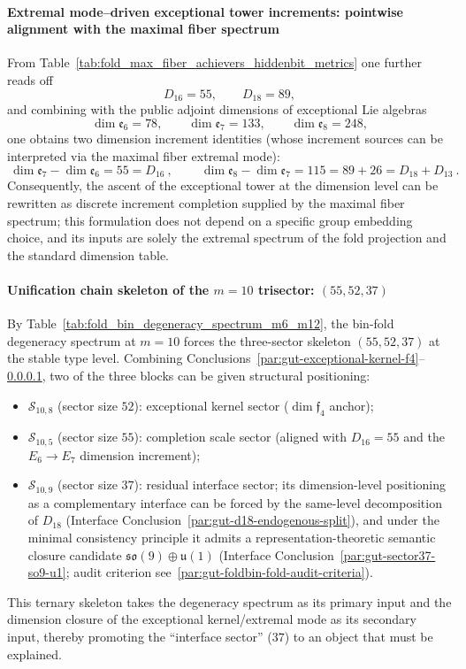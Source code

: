 \paragraph{Extremal mode--driven exceptional tower increments: pointwise alignment with the maximal fiber spectrum}\label{par:gut-maxfiber-exceptional-tower}
From Table~\ref{tab:fold_max_fiber_achievers_hiddenbit_metrics} one further reads off
\[
D_{16}=55,\qquad D_{18}=89,
\]
and combining with the public adjoint dimensions of exceptional Lie algebras
\[
\dim\mathfrak{e}_6=78,\qquad \dim\mathfrak{e}_7=133,\qquad \dim\mathfrak{e}_8=248,
\]
one obtains two dimension increment identities (whose increment sources can be interpreted via the maximal fiber extremal mode):
\[
\boxed{\ \dim\mathfrak{e}_7-\dim\mathfrak{e}_6=55=D_{16}\ },
\qquad
\boxed{\ \dim\mathfrak{e}_8-\dim\mathfrak{e}_7=115=89+26=D_{18}+D_{13}\ }.
\]
Consequently, the ascent of the exceptional tower at the dimension level can be rewritten as discrete increment completion supplied by the maximal fiber spectrum; this formulation does not depend on a specific group embedding choice, and its inputs are solely the extremal spectrum of the fold projection and the standard dimension table.

\paragraph{Unification chain skeleton of the \(m=10\) trisector: \texorpdfstring{$(55,52,37)$}{(55,52,37)}}\label{par:gut-trisector-55-52-37}
By Table~\ref{tab:fold_bin_degeneracy_spectrum_m6_m12}, the bin-fold degeneracy spectrum at \(m=10\) forces the three-sector skeleton \((55,52,37)\) at the stable type level.
Combining Conclusions~\ref{par:gut-exceptional-kernel-f4}--\ref{par:gut-maxfiber-exceptional-tower}, two of the three blocks can be given structural positioning:
\begin{itemize}
  \item \(\mathcal{S}_{10,8}\) (sector size \(52\)): exceptional kernel sector (\(\dim\mathfrak{f}_4\) anchor);
  \item \(\mathcal{S}_{10,5}\) (sector size \(55\)): completion scale sector (aligned with \(D_{16}=55\) and the \(E_6\to E_7\) dimension increment);
  \item \(\mathcal{S}_{10,9}\) (sector size \(37\)): residual interface sector; its dimension-level positioning as a complementary interface can be forced by the same-level decomposition of \(D_{18}\) (Interface Conclusion~\ref{par:gut-d18-endogenous-split}), and under the minimal consistency principle it admits a representation-theoretic semantic closure candidate \(\mathfrak{so}(9)\oplus\mathfrak{u}(1)\) (Interface Conclusion~\ref{par:gut-sector37-so9-u1}; audit criterion see~\ref{par:gut-foldbin-fold-audit-criteria}).
\end{itemize}
This ternary skeleton takes the degeneracy spectrum as its primary input and the dimension closure of the exceptional kernel/extremal mode as its secondary input, thereby promoting the ``interface sector'' (\(37\)) to an object that must be explained.

